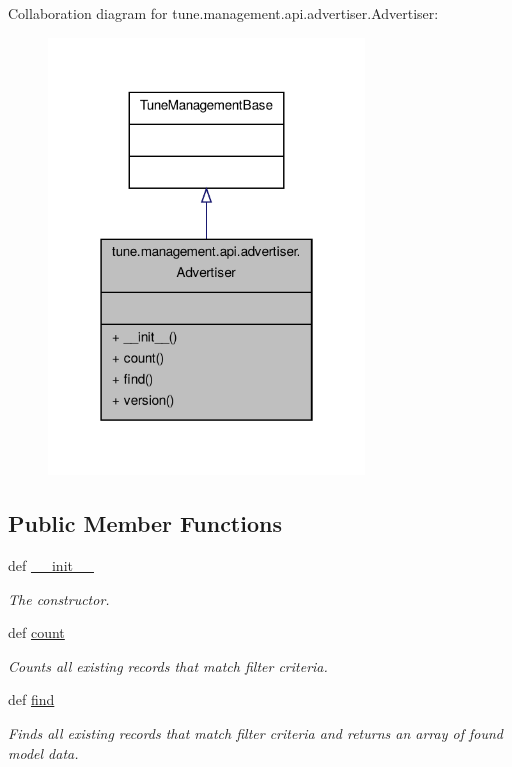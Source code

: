 Collaboration diagram for tune.\-management.\-api.\-advertiser.\-Advertiser\-:
\nopagebreak
\begin{figure}[H]
\begin{center}
\leavevmode
\includegraphics[width=238pt]{classtune_1_1management_1_1api_1_1advertiser_1_1Advertiser__coll__graph}
\end{center}
\end{figure}
\subsection*{Public Member Functions}
\begin{DoxyCompactItemize}
\item 
def \hyperlink{classtune_1_1management_1_1api_1_1advertiser_1_1Advertiser_a47b225259643daa567a8cf872b6af878}{\-\_\-\-\_\-init\-\_\-\-\_\-}
\begin{DoxyCompactList}\small\item\em The constructor. \end{DoxyCompactList}\item 
def \hyperlink{classtune_1_1management_1_1api_1_1advertiser_1_1Advertiser_a797fdee675b686bd1e3b0b9b3bcb6b98}{count}
\begin{DoxyCompactList}\small\item\em Counts all existing records that match filter criteria. \end{DoxyCompactList}\item 
def \hyperlink{classtune_1_1management_1_1api_1_1advertiser_1_1Advertiser_a758ffc0ead470458c29a5e3da342cfd7}{find}
\begin{DoxyCompactList}\small\item\em Finds all existing records that match filter criteria and returns an array of found model data. \end{DoxyCompactList}\end{DoxyCompactItemize}
